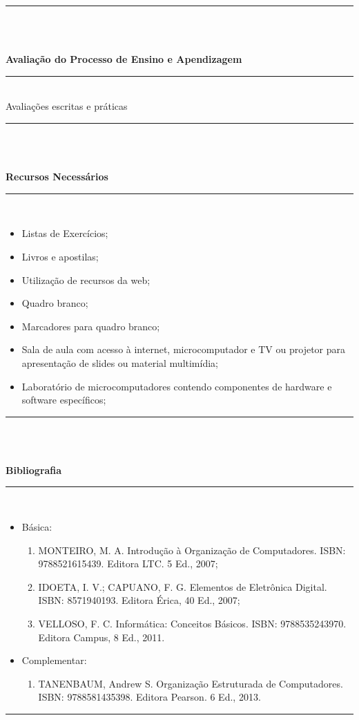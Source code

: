 \noindent\rule{16.5cm}{0.4pt}\\
\\
\vspace{-12mm}
\begin{center}\textbf{Avaliação do Processo de Ensino e Apendizagem}\end{center}
\vspace{-5mm}
\noindent\rule{16.5cm}{0.4pt}
\\
   Avaliações escritas e pr\'aticas\\
\noindent\rule{16.5cm}{0.4pt}\\
\\
\vspace{-12mm}
\begin{center}\textbf{Recursos Necessários}\end{center}
\vspace{-5mm}
\noindent\rule{16.5cm}{0.4pt}
\\
\begin{itemize} 
  \item Listas de Exercícios;
  \item Livros e apostilas;
  \item Utilização de recursos da web;
  \item Quadro branco;
  \item Marcadores para quadro branco;
  \item Sala de aula com acesso à internet, microcomputador e TV ou projetor para apresentação de slides ou material multimídia;
  \item Laboratório de microcomputadores contendo componentes de hardware e software específicos;
\end{itemize}
\noindent\rule{16.5cm}{0.4pt}\\
\\
\vspace{-12mm}
\begin{center}\textbf{Bibliografia}\end{center}
\vspace{-5mm}
\noindent\rule{16.5cm}{0.4pt}
\\
\begin{itemize} 
  \item Básica:
	\begin{enumerate}
	\item MONTEIRO, M. A. Introdução à Organização de Computadores. ISBN: 9788521615439. Editora LTC. 5 Ed., 2007; 
	\item IDOETA, I. V.; CAPUANO, F. G. Elementos de Eletrônica Digital. ISBN: 8571940193. Editora Érica, 40 Ed., 2007;
	\item VELLOSO, F. C. Informática: Conceitos Básicos. ISBN: 9788535243970. Editora Campus, 8 Ed., 2011. 
	\end{enumerate}
  \item Complementar:
	\begin{enumerate} 
	\item TANENBAUM, Andrew S. Organização Estruturada de Computadores. ISBN: 9788581435398. Editora Pearson. 6 Ed., 2013.
	\end{enumerate}
\end{itemize}
\noindent\rule{16.5cm}{0.4pt}\\
\\
